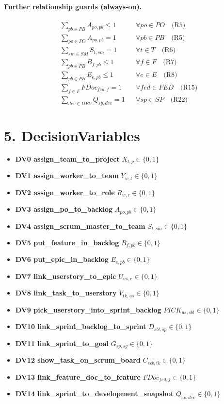 \documentclass[11pt,a4paper]{article}
\begin{document}
\paragraph{Further relationship guards (always-on).}
\begin{align*}
&\sum_{pb\in PB} A_{po,pb} \le 1 && \forall po\in PO \quad\text{(R5)} \\
&\sum_{po\in PO} A_{po,pb} = 1 && \forall pb\in PB \quad\text{(R5)} \\
&\sum_{sm\in SM} S_{t,sm} = 1 && \forall t\in T \quad\text{(R6)} \\
&\sum_{pb\in PB} B_{f,pb} \le 1 && \forall f\in F \quad\text{(R7)} \\
&\sum_{pb\in PB} E_{e,pb} \le 1 && \forall e\in E \quad\text{(R8)} \\
&\sum_{f\in F} FDoc_{fed,f} = 1 && \forall fed\in FED \quad\text{(R15)} \\
&\sum_{dev\in DEV} Q_{sp,dev} = 1 && \forall sp\in SP \quad\text{(R22)}
\end{align*}

\section{5. DecisionVariables}
\begin{itemize}
  \item \textbf{DV0 assign\_team\_to\_project} $X_{t,p}\in\{0,1\}$
  \item \textbf{DV1 assign\_worker\_to\_team} $Y_{w,t}\in\{0,1\}$
  \item \textbf{DV2 assign\_worker\_to\_role} $R_{w,r}\in\{0,1\}$
  \item \textbf{DV3 assign\_po\_to\_backlog} $A_{po,pb}\in\{0,1\}$
  \item \textbf{DV4 assign\_scrum\_master\_to\_team} $S_{t,sm}\in\{0,1\}$
  \item \textbf{DV5 put\_feature\_in\_backlog} $B_{f,pb}\in\{0,1\}$
  \item \textbf{DV6 put\_epic\_in\_backlog} $E_{e,pb}\in\{0,1\}$
  \item \textbf{DV7 link\_userstory\_to\_epic} $U_{us,e}\in\{0,1\}$
  \item \textbf{DV8 link\_task\_to\_userstory} $V_{tk,us}\in\{0,1\}$
  \item \textbf{DV9 pick\_userstory\_into\_sprint\_backlog} $PICK_{us,sbl}\in\{0,1\}$
  \item \textbf{DV10 link\_sprint\_backlog\_to\_sprint} $D_{sbl,sp}\in\{0,1\}$
  \item \textbf{DV11 link\_sprint\_to\_goal} $G_{sp,sg}\in\{0,1\}$
  \item \textbf{DV12 show\_task\_on\_scrum\_board} $C_{scb,tk}\in\{0,1\}$
  \item \textbf{DV13 link\_feature\_doc\_to\_feature} $FDoc_{fed,f}\in\{0,1\}$
  \item \textbf{DV14 link\_sprint\_to\_development\_snapshot} $Q_{sp,dev}\in\{0,1\}$
\end{itemize}
\end{document}
